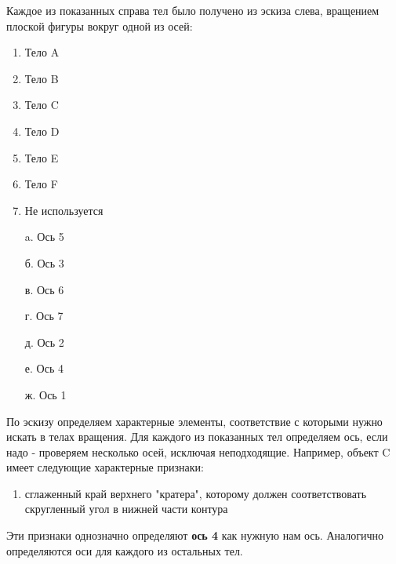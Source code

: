 
Каждое из показанных справа тел было получено из эскиза слева, вращением плоской фигуры вокруг одной из осей:  


\begin{multicols}{2}
    {
        \begin{enumerate}
            \item Тело A
            \item Тело B
            \item Тело C
            \item Тело D
            \item Тело E
            \item Тело F
            \item Не используется
        \end{enumerate}
    }
    {
        \begin{enumerate}
            \item[a.] Ось 5
            \item[б.] Ось 3
            \item[в.] Ось 6
            \item[г.] Ось 7
            \item[д.] Ось 2
            \item[е.] Ось 4
            \item[ж.] Ось 1      
        \end{enumerate}
    }
\end{multicols}

\solutionSection

По эскизу определяем характерные элементы, соответствие с которыми нужно искать в телах вращения. Для каждого из показанных тел определяем ось, если надо - проверяем несколько осей, исключая неподходящие.  Например, объект C имеет следующие характерные признаки:
\begin{enumerate}
    \item сглаженный край верхнего "кратера"{}, которому должен соответствовать скругленный угол в нижней части контура
\end{enumerate}


Эти признаки однозначно определяют \textbf{ось 4} как нужную нам ось. Аналогично определяются оси для каждого из остальных тел.


